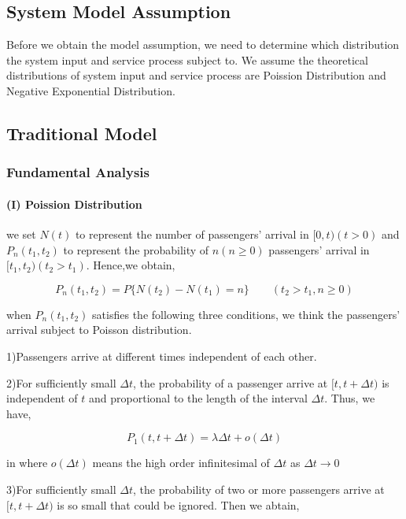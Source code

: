 \documentclass{mcmthesis}
\begin{document}
\subsection{System Model Assumption}%
Before we obtain the model assumption, we need to determine which distribution the system input and service process subject to. We assume the theoretical distributions of system input and service process are Poission Distribution and Negative Exponential Distribution.
\subsection{Traditional Model}%
\subsubsection{Fundamental Analysis}%
\paragraph{(I) Poission  Distribution}%
we set $ N(t) $ to represent the number of passengers'  arrival in $ [0,t)(t>0) $ and $ P_n(t_1,t_2) $
to represent the probability of $ n(n\geqslant 0) $ passengers'  arrival  in $ [t_1,t_2)(t_2>t_1) $. Hence,we obtain,

\begin{equation}
P_n(t_1,t_2)=P\{  N(t_2)-N(t_1) =n \} \qquad (t_2>t_1,n\geqslant 0)
\end{equation}

when $P_n(t_1,t_2)$ satisfies the following three conditions, we think the passengers'  arrival subject to Poisson distribution.
\par 1)Passengers arrive at different times independent of each other.
\par 2)For sufficiently small $\Delta t$, the probability of a passenger arrive at $[t,t+\Delta t)$ is independent of $t$ and proportional to the length of the interval  $\Delta t$.
Thus, we have,

\begin{equation}
P_1(t,t+\Delta t)=\lambda \Delta t+o(\Delta t)  \label{e2}
\end{equation}

in where $o(\Delta t)$ means the high order infinitesimal of $\Delta t$ as $\Delta t \rightarrow 0$
\par 3)For sufficiently small $\Delta t$, the probability of two or more  passengers arrive at $[t,t+\Delta t)$ is so small that could be ignored. Then we abtain,
 
\end{document}
